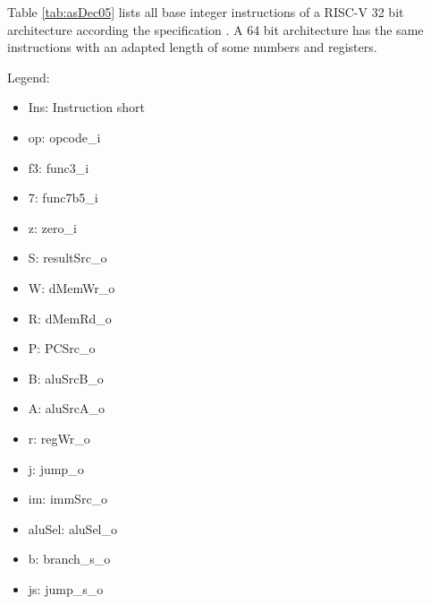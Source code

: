 
Table \ref{tab:asDec05} lists all base integer instructions of a RISC-V 32 bit architecture according the specification \cite{riscvisa03}. A 64 bit architecture has the same instructions with an adapted length of some numbers and registers.

Legend: 
\begin{itemize}
  \item Ins: Instruction short
  \item op: opcode\_i
  \item f3: func3\_i
  \item 7: func7b5\_i
  \item z: zero\_i
  \item S: resultSrc\_o
  \item W: dMemWr\_o
  \item R: dMemRd\_o
  \item P: PCSrc\_o
  \item B: aluSrcB\_o
  \item A: aluSrcA\_o
  \item r: regWr\_o
  \item j: jump\_o
  \item im: immSrc\_o
  \item aluSel: aluSel\_o
  \item b: branch\_s\_o
  \item js: jump\_s\_o
\end{itemize}
